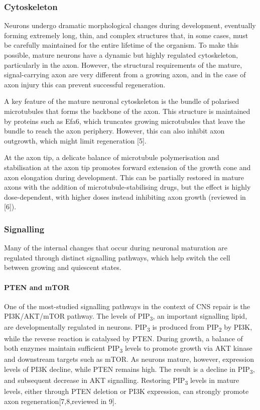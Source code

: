 \documentclass[
  12pt,
  a4paper,
]{article}
\begin{document}
\hypertarget{cytoskeleton}{%
\subsubsection{Cytoskeleton}\label{cytoskeleton}}

Neurons undergo dramatic morphological changes during development,
eventually forming extremely long, thin, and complex structures that, in
some cases, must be carefully maintained for the entire lifetime of the
organism. To make this possible, mature neurons have a dynamic but
highly regulated cytoskeleton, particularly in the axon. However, the
structural requirements of the mature, signal-carrying axon are very
different from a growing axon, and in the case of axon injury this can
prevent successful regeneration.

A key feature of the mature neuronal cytoskeleton is the bundle of
polarised microtubules that forms the backbone of the axon. This
structure is maintained by proteins such as Efa6, which truncates
growing microtubules that leave the bundle to reach the axon periphery.
However, this can also inhibit axon outgrowth, which might limit
regeneration {[}5{]}.

At the axon tip, a delicate balance of microtubule polymerisation and
stabilisation at the axon tip promotes forward extension of the growth
cone and axon elongation during development. This can be partially
restored in mature axons with the addition of microtubule-stabilising
drugs, but the effect is highly dose-dependent, with higher doses
instead inhibiting axon growth (reviewed in {[}6{]}).

\hypertarget{signalling}{%
\subsubsection{Signalling}\label{signalling}}

Many of the internal changes that occur during neuronal maturation are
regulated through distinct signalling pathways, which help switch the
cell between growing and quiescent states.

\hypertarget{pten-and-mtor}{%
\paragraph{PTEN and mTOR}\label{pten-and-mtor}}

One of the most-studied signalling pathways in the context of CNS repair
is the PI3K/AKT/mTOR pathway. The levels of PIP\textsubscript{3}, an
important signalling lipid, are developmentally regulated in neurons.
PIP\textsubscript{3} is produced from PIP\textsubscript{2} by PI3K,
while the reverse reaction is catalysed by PTEN. During growth, a
balance of both enzymes maintain sufficient PIP\textsubscript{3} levels
to promote growth via AKT kinase and downstream targets such as mTOR. As
neurons mature, however, expression levels of PI3K decline, while PTEN
remains high. The result is a decline in PIP\textsubscript{3}, and
subsequent decrease in AKT signalling. Restoring PIP\textsubscript{3}
levels in mature levels, either through PTEN deletion or PI3K
expression, can strongly promote axon regeneration{[}7,8,reviewed in
9{]}.
\end{document}
